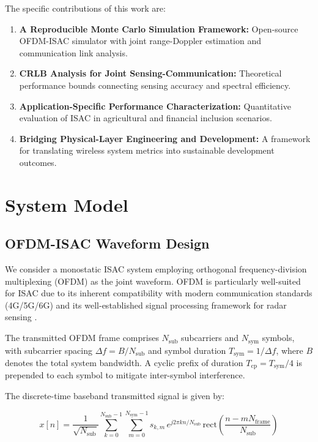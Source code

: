 \documentclass[conference]{IEEEtran}
\begin{document}
The specific contributions of this work are:

\begin{enumerate}
    \item \textbf{A Reproducible Monte Carlo Simulation Framework:} Open-source OFDM-ISAC simulator with joint range-Doppler estimation and communication link analysis.
    \item \textbf{CRLB Analysis for Joint Sensing-Communication:} Theoretical performance bounds connecting sensing accuracy and spectral efficiency.
    \item \textbf{Application-Specific Performance Characterization:} Quantitative evaluation of ISAC in agricultural and financial inclusion scenarios.
    \item \textbf{Bridging Physical-Layer Engineering and Development:} A framework for translating wireless system metrics into sustainable development outcomes.
\end{enumerate}

\section{System Model}

\subsection{OFDM-ISAC Waveform Design}

We consider a monostatic ISAC system employing orthogonal frequency-division multiplexing (OFDM) as the joint waveform. OFDM is particularly well-suited for ISAC due to its inherent compatibility with modern communication standards (4G/5G/6G) and its well-established signal processing framework for radar sensing \cite{sturm2015ofdm}.

The transmitted OFDM frame comprises $N_{\mathrm{sub}}$ subcarriers and $N_{\mathrm{sym}}$ symbols, with subcarrier spacing $\Delta f = B / N_{\mathrm{sub}}$ and symbol duration $T_{\mathrm{sym}} = 1/\Delta f$, where $B$ denotes the total system bandwidth. A cyclic prefix of duration $T_{\mathrm{cp}} = T_{\mathrm{sym}} / 4$ is prepended to each symbol to mitigate inter-symbol interference.

The discrete-time baseband transmitted signal is given by:

{\footnotesize
\begin{equation}
    x[n] = \frac{1}{\sqrt{N_{\mathrm{sub}}}} \sum_{k=0}^{N_{\mathrm{sub}}-1} \sum_{m=0}^{N_{\mathrm{sym}}-1} s_{k,m} \, e^{j2\pi k n / N_{\mathrm{sub}}} \, \mathrm{rect}\left(\frac{n - mN_{\mathrm{frame}}}{N_{\mathrm{sub}}}\right)
    \label{eq:ofdm_tx}
\end{equation}}
\end{document}
